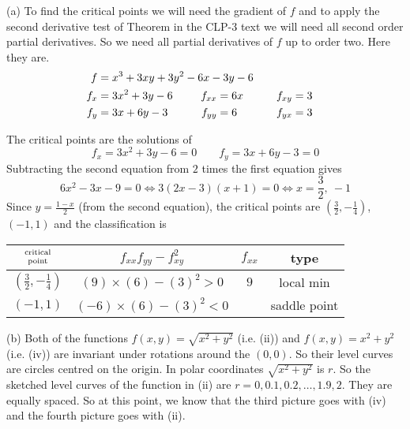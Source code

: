 \begin{solution}
(a)
To find the critical points we will need the
gradient of $f$ and to apply the second derivative test of 
Theorem  in the CLP-3 text 
we will need all 
second order partial derivatives. So we need all partial derivatives of
$f$ up to order two.
Here they are.
\begin{alignat*}{3}
f&=x^3 + 3xy + 3y^2 - 6x - 3y - 6 \hidewidth\\
f_x&=3x^2+3y-6   & f_{xx}&=6x \qquad & f_{xy}&= 3\\
f_y&=3x+6y-3 \qquad & f_{yy}&=6\qquad & f_{yx}&= 3
\end{alignat*}

The critical points are the solutions of
\begin{equation*}
f_x=3x^2+3y-6=0   \qquad
f_y=3x+6y-3 = 0
\end{equation*}
Subtracting the second equation from $2$ times the first equation gives
\begin{equation*}
6x^2-3x-9=0
\iff
3(2x-3)(x+1)=0
\iff x=\frac{3}{2},\ -1
\end{equation*}
Since $y=\frac{1-x}{2}$ (from the second equation),
the critical points are $(\frac{3}{2},-\frac{1}{4})$, $(-1,1)$ and 
the classification is
\begin{center}
\renewcommand{\arraystretch}{1.3}
     \begin{tabular}{|c|c|c|c|}
     \hline
    $\Atop{\text{critical}}{\text{point}}$  & $f_{xx}f_{yy}-f_{xy}^2$ & 
                                                          $f_{xx}$ & type \\    
    \hline
     $(\frac{3}{2},-\frac{1}{4})$  & $(9)\times(6)-(3)^2> 0$ & $9$   
                       & local min  \\ \hline
     $(-1,1)$  & $(-6)\times (6)-(3)^2<0$ &   & saddle point \\  \hline
     \end{tabular}
\renewcommand{\arraystretch}{1.0}
\end{center}

(b) Both of the functions  $f(x, y) = \sqrt{x^2 + y^2}$ (i.e. (ii))
and  $f(x, y) = x^2 + y^2$ (i.e. (iv)) are invariant under rotations
around the $(0,0)$. So their level curves are circles centred on 
the origin. In polar coordinates $\sqrt{x^2 + y^2}$ is $r$. 
So the sketched level curves of the function in (ii) are
$r = 0, 0.1, 0.2, \ldots , 1.9, 2$. They are equally spaced.
So at this point, we know that the third picture goes with (iv)
and the fourth picture goes with (ii).


\end{solution}
